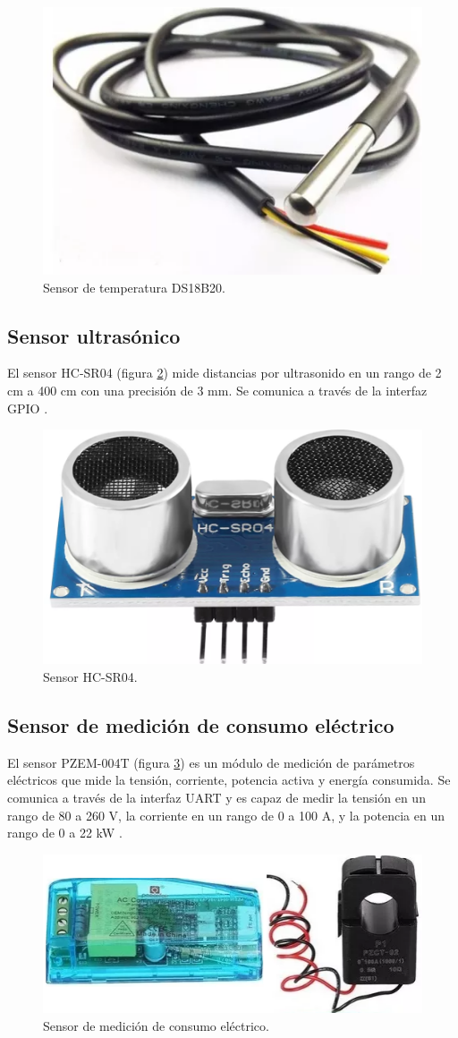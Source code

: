 \begin{figure}[H]
	\centering
	\includegraphics[height=.15\textwidth]{./Images/10.png}
	\caption{Sensor de temperatura DS18B20.}
	\label{fig:DS18B20}
\end{figure}

\subsection{Sensor ultrasónico}

El sensor HC-SR04 (figura \ref{fig:HC-SR04}) mide distancias por ultrasonido en
un rango de 2 cm a 400 cm con una precisión de 3 mm. Se comunica a través de la
interfaz GPIO \cite{HC-SR04}.

\begin{figure}[H]
	\centering
	\includegraphics[height=.15\textwidth]{./Images/11.png}
	\caption{Sensor HC-SR04.}
	\label{fig:HC-SR04}
\end{figure}

\subsection{Sensor de medición de consumo eléctrico}

El sensor PZEM-004T (figura \ref{fig:PZEM-004T}) es un módulo de medición de
parámetros eléctricos que mide la tensión, corriente, potencia activa y energía
consumida. Se comunica a través de la interfaz UART y es capaz de medir la
tensión en un rango de 80 a 260 V, la corriente en un rango de 0 a 100 A, y la
potencia en un rango de 0 a 22 kW \cite{PZEM-004T}.

\begin{figure}[H]
	\centering
	\includegraphics[height=.15\textwidth]{./Images/12.png}
	\caption{Sensor de medición de consumo eléctrico.}
	\label{fig:PZEM-004T}
\end{figure}

